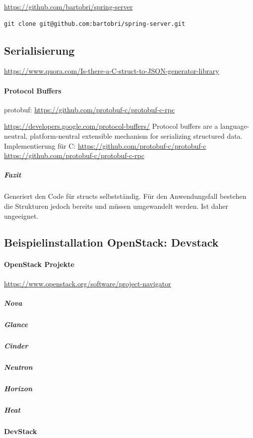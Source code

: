 \documentclass[a4paper,10pt]{article}
\numberwithin{figure}{section}
\numberwithin{table}{section}
\begin{document}
\url{https://github.com/bartobri/spring-server}

\begin{lstlisting}[frame=single,caption=Installation bartobri/spring-serve, breaklines=truer]
git clone git@github.com:bartobri/spring-server.git
\end{lstlisting}

\subsection{Serialisierung}

\url{https://www.quora.com/Is-there-a-C-struct-to-JSON-generator-library}

\paragraph{Protocol Buffers}


protobuf: \url{https://github.com/protobuf-c/protobuf-c-rpc}

\url{https://developers.google.com/protocol-buffers/}
Protocol buffers are a language-neutral, platform-neutral extensible mechanism for serializing structured data.
Implementierung für C:
\url{https://github.com/protobuf-c/protobuf-c}
\url{https://github.com/protobuf-c/protobuf-c-rpc}

\subparagraph{Fazit}

Generiert den Code für structs selbstständig.
Für den Anwendungsfall bestehen die Strukturen jedoch bereits und müssen umgewandelt werden.
Ist daher ungeeignet.

\subsection{Beispielinstallation OpenStack: Devstack}


\paragraph{OpenStack Projekte}

\url{https://www.openstack.org/software/project-navigator}

\subparagraph{Nova}
\subparagraph{Glance}
\subparagraph{Cinder}
\subparagraph{Neutron}
\subparagraph{Horizon}
\subparagraph{Heat}

\paragraph{DevStack}
\end{document}
